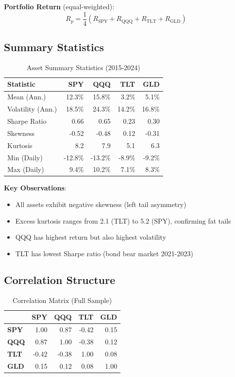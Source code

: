 \documentclass[12pt,a4paper]{article}
\begin{document}
\textbf{Portfolio Return} (equal-weighted):
\begin{equation}
R_p = \frac{1}{4}(R_{\text{SPY}} + R_{\text{QQQ}} + R_{\text{TLT}} + R_{\text{GLD}})
\end{equation}

\subsection{Summary Statistics}

\begin{table}[H]
\centering
\begin{tabular}{@{}lrrrr@{}}
\toprule
\textbf{Statistic} & \textbf{SPY} & \textbf{QQQ} & \textbf{TLT} & \textbf{GLD} \\ \midrule
Mean (Ann.) & 12.3\% & 15.8\% & 3.2\% & 5.1\% \\
Volatility (Ann.) & 18.5\% & 24.3\% & 14.2\% & 16.8\% \\
Sharpe Ratio & 0.66 & 0.65 & 0.23 & 0.30 \\
Skewness & -0.52 & -0.48 & 0.12 & -0.31 \\
Kurtosis & 8.2 & 7.9 & 5.1 & 6.3 \\
Min (Daily) & -12.8\% & -13.2\% & -8.9\% & -9.2\% \\
Max (Daily) & 9.4\% & 10.2\% & 7.1\% & 8.3\% \\ \bottomrule
\end{tabular}
\caption{Asset Summary Statistics (2015-2024)}
\end{table}

\textbf{Key Observations}:
\begin{itemize}
    \item All assets exhibit negative skewness (left tail asymmetry)
    \item Excess kurtosis ranges from 2.1 (TLT) to 5.2 (SPY), confirming fat tails
    \item QQQ has highest return but also highest volatility
    \item TLT has lowest Sharpe ratio (bond bear market 2021-2023)
\end{itemize}

\subsection{Correlation Structure}

\begin{table}[H]
\centering
\begin{tabular}{@{}lrrrr@{}}
\toprule
& \textbf{SPY} & \textbf{QQQ} & \textbf{TLT} & \textbf{GLD} \\ \midrule
\textbf{SPY} & 1.00 & 0.87 & -0.42 & 0.15 \\
\textbf{QQQ} & 0.87 & 1.00 & -0.38 & 0.12 \\
\textbf{TLT} & -0.42 & -0.38 & 1.00 & 0.08 \\
\textbf{GLD} & 0.15 & 0.12 & 0.08 & 1.00 \\ \bottomrule
\end{tabular}
\caption{Correlation Matrix (Full Sample)}
\end{table}
\end{document}
